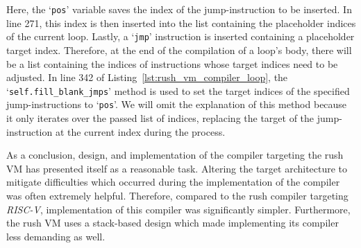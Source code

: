
Here, the `\texttt{pos}' variable saves the index of the jump-instruction to be inserted.
In line 271, this index is then inserted into the list containing the placeholder indices of the current loop.
Lastly, a `\texttt{jmp}' instruction is inserted containing a placeholder target index.
Therefore, at the end of the compilation of a loop's body, there will be a list containing the indices of instructions whose target indices need to be adjusted.
In line 342 of Listing~\ref{lst:rush_vm_compiler_loop}, the `\texttt{self.fill\_blank\_jmps}' method is used to set the target indices of the specified jump-instructions to `\texttt{pos}'.
We will omit the explanation of this method because it only iterates over the passed list of indices, replacing the target of the jump-instruction at the current index during the process.

As a conclusion, design, and implementation of the compiler targeting the rush VM has presented itself as a reasonable task.
Altering the target architecture to mitigate difficulties which occurred during the implementation of the compiler was often extremely helpful.
Therefore, compared to the rush compiler targeting \emph{RISC-V},
implementation of this compiler was significantly simpler.
Furthermore, the rush VM uses a stack-based design which made implementing its compiler less demanding as well.
